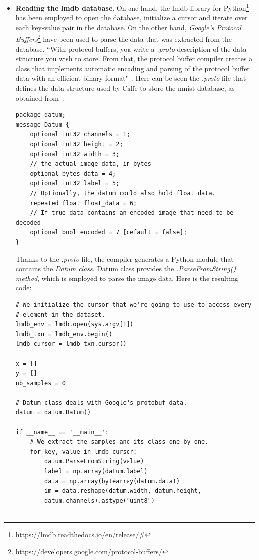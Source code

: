 \begin{itemize}
	\item \textbf{Reading the \gls{lmdb} database}. On one hand, the \gls{lmdb} library for Python\footnote{\url{https://lmdb.readthedocs.io/en/release/\#}} has been employed to open the database, initialize a cursor and iterate over each key-value pair in the database. On the other hand, \emph{Google's Protocol Buffers}\footnote{\url{https://developers.google.com/protocol-buffers/}} have been used to parse the data that was extracted from the database. ``With protocol buffers, you write a \textit{.proto} description of the data structure you wish to store. From that, the protocol buffer compiler creates a class that implements automatic encoding and parsing of the protocol buffer data with an efficient binary format"~\cite{protobuf}. Here can be seen the \textit{.proto} file that defines the data structure used by Caffe to store the \gls{mnist} database, as obtained from~\cite{lmdb_tutorial}: 
	
\begin{lstlisting}
package datum;
message Datum {
	optional int32 channels = 1;
	optional int32 height = 2;
	optional int32 width = 3;
	// the actual image data, in bytes
	optional bytes data = 4;
	optional int32 label = 5;
	// Optionally, the datum could also hold float data.
	repeated float float_data = 6;
	// If true data contains an encoded image that need to be decoded
	optional bool encoded = 7 [default = false];
}
\end{lstlisting}
	
	Thanks to the \textit{.proto} file, the compiler generates a Python module that contains the \emph{Datum class}. Datum class provides the \emph{\textit{.ParseFromString()} method}, which is employed to parse the image data. Here is the resulting code:

\begin{lstlisting}
# We initialize the cursor that we're going to use to access every
# element in the dataset.
lmdb_env = lmdb.open(sys.argv[1])
lmdb_txn = lmdb_env.begin()
lmdb_cursor = lmdb_txn.cursor()

x = []
y = []
nb_samples = 0

# Datum class deals with Google's protobuf data.
datum = datum.Datum()

if __name__ == '__main__':
	# We extract the samples and its class one by one.
	for key, value in lmdb_cursor:
		datum.ParseFromString(value)
		label = np.array(datum.label)
		data = np.array(bytearray(datum.data))
		im = data.reshape(datum.width, datum.height,
		datum.channels).astype("uint8")
	

\end{lstlisting}
\end{itemize}
